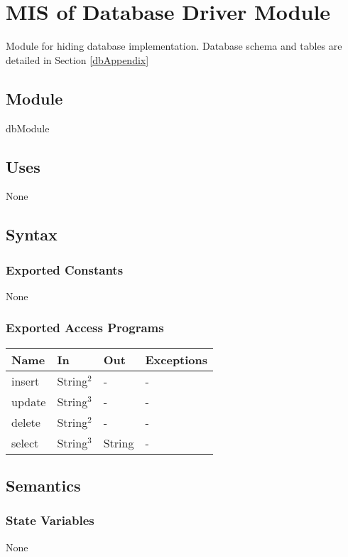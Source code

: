 \documentclass[12pt, titlepage]{article}
\begin{document}
\newpage

\section{MIS of Database Driver Module} \label{mDBDriver}
Module for hiding database implementation. Database schema and tables are detailed in Section \ref{dbAppendix}

\subsection{Module}
dbModule

\subsection{Uses}
None

\subsection{Syntax}

\subsubsection{Exported Constants}
None

\subsubsection{Exported Access Programs}

\begin{center}
\begin{tabular}{p{4cm} p{4cm} p{4cm} p{3cm}}
\hline
\textbf{Name} & \textbf{In} & \textbf{Out} & \textbf{Exceptions} \\
\hline
insert & String$^2$ & - & - \\
update & String$^3$ & - & - \\
delete & String$^2$ & - & - \\
select & String$^3$ & String & - \\
\hline
\end{tabular}
\end{center}

\subsection{Semantics}

\subsubsection{State Variables}
None
\end{document}

